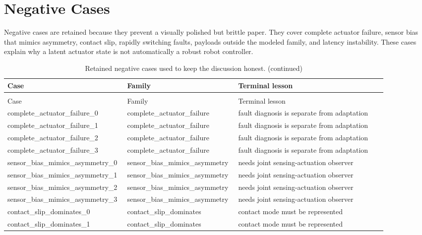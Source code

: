 \documentclass{article}
\begin{document}
\section{Negative Cases}
Negative cases are retained because they prevent a visually polished but brittle paper. They cover complete actuator failure, sensor bias that mimics asymmetry, contact slip, rapidly switching faults, payloads outside the modeled family, and latency instability. These cases explain why a latent actuator state is not automatically a robust robot controller.
\begin{center}
\scriptsize
\begin{longtable}{p{0.26\linewidth}p{0.25\linewidth}p{0.38\linewidth}}
\caption{Retained negative cases used to keep the discussion honest.}\label{tab:negative}\\
\toprule
Case & Family & Terminal lesson\\
\midrule
\endfirsthead
\caption[]{Retained negative cases used to keep the discussion honest. (continued)}\\
\toprule
Case & Family & Terminal lesson\\
\midrule
\endhead
complete\_actuator\_failure\_0 & complete\_actuator\_failure & fault diagnosis is separate from adaptation\\
complete\_actuator\_failure\_1 & complete\_actuator\_failure & fault diagnosis is separate from adaptation\\
complete\_actuator\_failure\_2 & complete\_actuator\_failure & fault diagnosis is separate from adaptation\\
complete\_actuator\_failure\_3 & complete\_actuator\_failure & fault diagnosis is separate from adaptation\\
sensor\_bias\_mimics\_asymmetry\_0 & sensor\_bias\_mimics\_asymmetry & needs joint sensing-actuation observer\\
sensor\_bias\_mimics\_asymmetry\_1 & sensor\_bias\_mimics\_asymmetry & needs joint sensing-actuation observer\\
sensor\_bias\_mimics\_asymmetry\_2 & sensor\_bias\_mimics\_asymmetry & needs joint sensing-actuation observer\\
sensor\_bias\_mimics\_asymmetry\_3 & sensor\_bias\_mimics\_asymmetry & needs joint sensing-actuation observer\\
contact\_slip\_dominates\_0 & contact\_slip\_dominates & contact mode must be represented\\
contact\_slip\_dominates\_1 & contact\_slip\_dominates & contact mode must be represented\\

\end{longtable}
\end{center}
\end{document}
